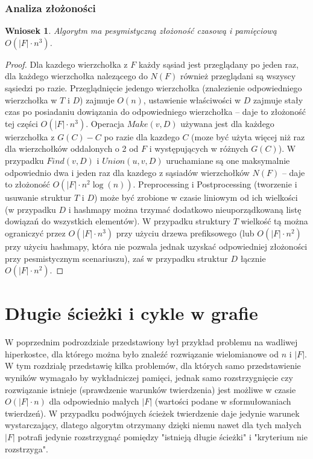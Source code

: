 \documentclass{pracamgr}
\newtheorem{corollary}[theorem]{Wniosek}
\begin{document}
    \subsubsection{Analiza złożoności}
    \begin{corollary}\label{zlozonosc lokalnej spojnosci}
     Algorytm ma pesymistyczną złożoność czasową i pamięciową $O(|F|\cdot n^3)$.
    \end{corollary}
    \begin{proof}
     Dla kazdego wierzchołka z $F$ każdy sąsiad jest przeglądany po jeden raz, dla każdego wierzchołka nalezącego do $N(F)$ również przeglądani są wszyscy sąsiedzi
     po razie. Przeglądnięcie jedengo wierzchołka (znalezienie odpowiedniego wierzchołka w $T$ i $D$) zajmuje $O(n)$,
     ustawienie właściwości w $D$ zajmuje stały czas po posiadaniu dowiązania do odpowiedniego wierzchołka -- daje to złożoność tej części $O(|F|\cdot n^3)$.\newline
     Operacja $Make(v,D)$ używana jest dla każdego wierzchołka z $G(C)-C$ po razie dla kazdego $C$
     (moze być użyta więcej niż raz dla wierzchołków oddalonych o 2 od $F$ i występujących w różnych $G(C)$).
     W przypadku $Find(v,D)$ i $Union(u,v,D)$ uruchamiane są one maksymalnie odpowiednio dwa i jeden raz dla kazdego z sąsiadów wierzchołków $N(F)$
     -- daje to złożoność $O(|F|\cdot n^2\log(n))$.\newline
     Preprocessing i Postprocessing (tworzenie i usuwanie struktur $T$ i $D$)
     może być zrobione w czasie liniowym od ich wielkości (w przypadku $D$ i hashmapy można trzymać dodatkowo nieuporządkowaną listę dowiązań do wszystkich
     elementów). W przypadku struktury $T$ wielkość tą można ograniczyć przez $O(|F|\cdot n^3)$ przy użyciu drzewa prefiksowego
     (lub $O(|F|\cdot n^2)$ przy użyciu hashmapy, która nie pozwala jednak uzyskać odpowiedniej złożoności przy pesmistycznym scenariuszu),
     zaś w przypadku struktur $D$ łącznie $O(|F|\cdot n^2)$.
    \end{proof}
  \section{Długie ścieżki i cykle w grafie} %
   W poprzednim podrozdziale przedstawiony był przykład problemu na wadliwej hiperkostce, dla którego można było znaleźć rozwiązanie wielomianowe od $n$ i $|F|$.
   W tym rozdzialę przedstawię kilka problemów, dla których samo przedstawienie wyników wymagało by wykładniczej pamięci,
   jednak samo rozstrzygnięcie czy rozwiązanie istnieje (sprawdzenie warunków twierdzenia) jest możliwe w czasie
   $O(|F|\cdot n)$ dla odpowiednio małych $|F|$ (wartości podane w sformułowaniach twierdzeń).
   W przypadku podwójnych ścieżek twierdzenie daje jedynie warunek wystarczający, dlatego algorytm otrzymany dzięki niemu nawet dla tych małych $|F|$ potrafi
   jedynie rozstrzygnąć pomiędzy "istnieją długie ścieżki" i "kryterium nie rozstrzyga".
\end{document}
